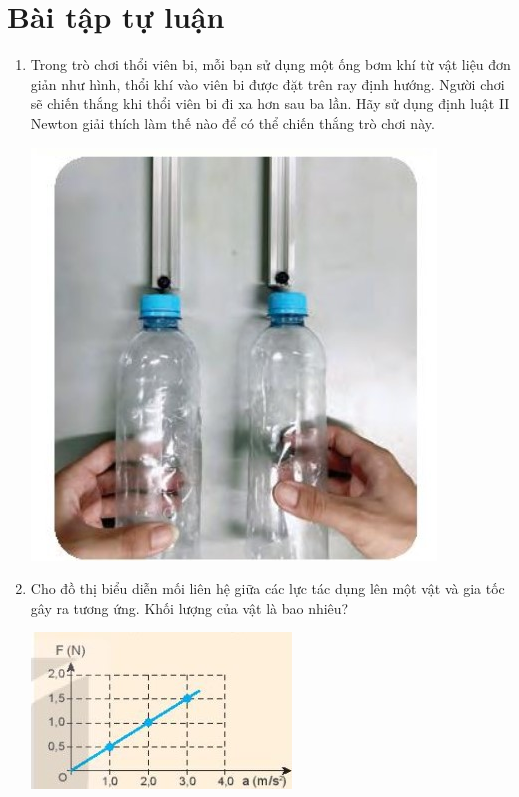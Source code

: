 \section{Bài tập tự luận}
\begin{enumerate}[label=\bfseries Bài \arabic*:]
	\item {}
	
	{
		Trong trò chơi thổi viên bi, mỗi bạn sử dụng một ống bơm khí từ vật liệu đơn giản như hình, thổi khí vào viên bi được đặt trên ray định hướng. Người chơi sẽ chiến thắng khi thổi viên bi đi xa hơn sau ba lần. Hãy sử dụng định luật II Newton giải thích làm thế nào để có thể chiến thắng trò chơi này.
		\begin{center}
			\includegraphics[scale=0.6]{../figs/VN10-2022-PH-TP017-5.jpg}
		\end{center}
	}
	

	\item {}
	
	
	{Cho đồ thị biểu diễn mối liên hệ giữa các lực tác dụng lên một vật và gia tốc gây ra tương ứng. Khối lượng của vật là bao nhiêu?
		
		\begin{center}
			\includegraphics[scale=1]{../figs/VN10-2022-PH-TP017-2.jpg}
		\end{center}
	}
	

\end{enumerate}
